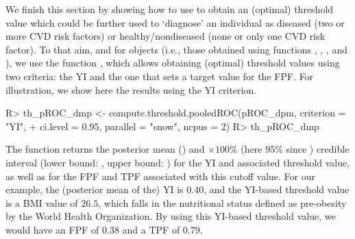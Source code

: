 We finish this section by showing how to use  to obtain an (optimal) threshold value which could be further used to `diagnose' an individual as diseased (two or more CVD risk factors) or healthy/nondiseased (none or only one CVD risk factor). To that aim, and for  objects (i.e., those obtained using functions , , , and ), we use the function , which allows obtaining (optimal) threshold values using two criteria: the YI and the one that sets a target value for the FPF. For illustration, we show here the results using the YI criterion.
\begin{example}
R> th_pROC_dmp <- compute.threshold.pooledROC(pROC_dpm, criterion = "YI", 
+ ci.level = 0.95, parallel = "snow", ncpus = 2)
R> th_pROC_dmp
\end{example}

The function returns the posterior mean () and $\%$ (here $95\%$ since ) credible interval (lower bound: , upper bound: ) for the YI and associated threshold value, as well as for the FPF and TPF associated with this cutoff value. For our example, the (posterior mean of the) YI is $0.40$, and the YI-based threshold value is a BMI value of $26.5$, which falls in the nutritional status defined as pre-obesity by the World Health Organization. By using this YI-based threshold value, we would have an FPF of $0.38$ and a TPF of $0.79$.

